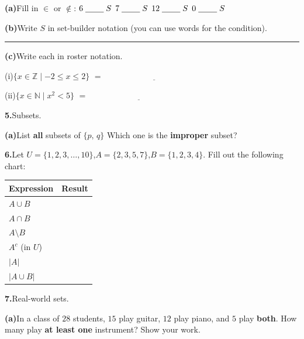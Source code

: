 \documentclass[12pt]{article}
\newcommand{\wl}{\par\vspace{5mm}\noindent\rule{\linewidth}{0.4pt}\par\vspace{1mm}}
\begin{document}
\medskip
\textbf{(a)}\quad Fill in $\in$ or $\notin$:\qquad
$6 \mathrel{\underline{\hspace{0.8cm}}} S$\qquad
$7 \mathrel{\underline{\hspace{0.8cm}}} S$\qquad
$12 \mathrel{\underline{\hspace{0.8cm}}} S$\qquad
$0 \mathrel{\underline{\hspace{0.8cm}}} S$

\medskip
\textbf{(b)}\quad Write $S$ in set-builder notation (you can use words for the condition).
\wl

\textbf{(c)}\quad Write each in roster notation.

\medskip
\hspace{1.5em}(i)\quad $\{x \in \mathbb{Z} \mid -2 \le x \le 2\}$ \hfill $= \;\underline{\hspace{5cm}}$

\medskip
\hspace{1.5em}(ii)\quad $\{x \in \mathbb{N} \mid x^2 < 5\}$ \hfill $= \;\underline{\hspace{5cm}}$

\bigskip
\textbf{5.}\quad[4 pts]\quad Subsets.

\medskip
\textbf{(a)}\quad List \textbf{all} subsets of $\{p,\,q\}$ Which one is the \textbf{improper} subset?


\newpage
\bigskip
\textbf{6.}\quad[8 pts]\quad Let $U = \{1,2,3,\ldots,10\}$,\quad $A = \{2,3,5,7\}$,\quad $B = \{1,2,3,4\}$. Fill out the following chart:

\medskip
\renewcommand{\arraystretch}{2.2}
\begin{tabular}{|C{4cm}|C{9cm}|}
\hline
Expression & Result \\
\hline
$A \cup B$ & \\
\hline
$A \cap B$ & \\
\hline
$A \setminus B$ & \\
\hline
$A^c$ (in $U$) & \\
\hline
$|A|$ & \\
\hline
$|A \cup B|$ & \\
\hline
\end{tabular}
\renewcommand{\arraystretch}{1}

\bigskip
\textbf{7.}\quad[4 pts]\quad Real-world sets.

\medskip
\textbf{(a)}\quad In a class of $28$ students, $15$ play guitar, $12$ play piano, and $5$ play \textbf{both}. How many play \textbf{at least one} instrument? Show your work.
\end{document}
